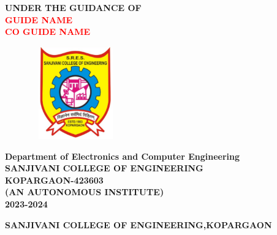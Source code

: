 \documentclass[12pt]{report}	%
\begin{document}
\begin{titlepage}
		\begin{center}
		{\bf{UNDER THE GUIDANCE OF}}\\
		\vspace{0.1in}
		{\large \bf \textcolor{red}{GUIDE NAME }}\\
		{\large \bf \textcolor{red}{CO GUIDE NAME }}\\
		\begin{figure}[h]
		\begin{center}
         \includegraphics[width=4cm, height=4cm]{logo.png}\\
		\end{center}
		\label{atcres}
		\end{figure}
		{\bf { Department of Electronics and Computer Engineering}}\\
		{ \bf SANJIVANI COLLEGE OF ENGINEERING }\\
		{\bf  KOPARGAON-423603}\\
		{\bf  (AN AUTONOMOUS INSTITUTE)}\\
		{\bf 2023-2024}
		\end{center}
		
\end{titlepage}
%
\newpage
\newenvironment{SANJIVANI COLLEGE OF ENGINEERING, KOPARGAON}
\thispagestyle{empty}
\begin{center}
\vspace*{50pt}
\Large
\textbf{SANJIVANI COLLEGE OF ENGINEERING,KOPARGAON}\\
\end{center}
\thispagestyle{empty}
\end{document}
